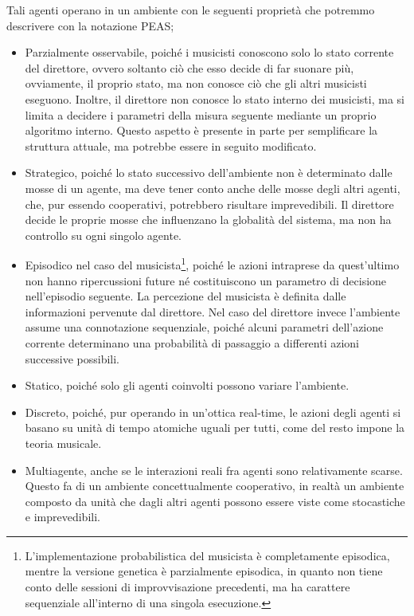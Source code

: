 Tali agenti operano in un ambiente con le seguenti proprietà che potremmo descrivere con la notazione PEAS;
\begin{itemize}
 \item Parzialmente osservabile, poiché i musicisti conoscono solo lo stato corrente del direttore, ovvero soltanto ciò che esso decide di far suonare più, ovviamente, il proprio stato, ma non conosce ciò che gli altri musicisti eseguono.
 Inoltre, il direttore non conosce lo stato interno dei musicisti, ma si limita a decidere i parametri della misura seguente mediante un proprio algoritmo interno.
 Questo aspetto è presente in parte per semplificare la struttura attuale, ma potrebbe essere in seguito modificato.
 \item Strategico, poiché lo stato successivo dell'ambiente non è determinato dalle mosse di un agente, ma deve tener conto anche delle mosse degli altri agenti, che, pur essendo cooperativi, potrebbero risultare imprevedibili.
 Il direttore decide le proprie mosse che influenzano la globalità del sistema, ma non ha controllo su ogni singolo agente.
 \item Episodico nel caso del musicista\footnote{L'implementazione probabilistica del musicista è completamente episodica, mentre la versione genetica è parzialmente episodica, in quanto non tiene conto delle sessioni di improvvisazione precedenti, ma ha carattere sequenziale all'interno di una singola esecuzione.}, poiché le azioni intraprese da quest'ultimo non hanno ripercussioni future né costituiscono un parametro di decisione nell'episodio seguente.
 La percezione del musicista è definita dalle informazioni pervenute dal direttore.
 Nel caso del direttore invece l'ambiente assume una connotazione sequenziale, poiché alcuni parametri dell'azione corrente determinano una probabilità di passaggio a differenti azioni successive possibili.
 \item Statico, poiché solo gli agenti coinvolti possono variare l'ambiente.
 \item Discreto, poiché, pur operando in un'ottica real-time, le azioni degli agenti si basano su unità di tempo atomiche uguali per tutti, come del resto impone la teoria musicale.
 \item Multiagente, anche se le interazioni reali fra agenti sono relativamente scarse. Questo fa di un ambiente concettualmente cooperativo, in realtà un ambiente composto da unità che dagli altri agenti possono essere viste come stocastiche e imprevedibili.
 \end{itemize}

